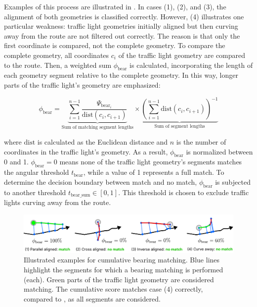 Examples of this process are illustrated in . In cases (1), (2), and (3), the alignment of both geometries is classified correctly. However, (4) illustrates one particular weakness: traffic light geometries initially aligned but then curving away from the route are not filtered out correctly. The reason is that only the first coordinate is compared, not the complete geometry. To compare the complete geometry, all coordinates $c_i$ of the traffic light geometry are compared to the route. Then, a weighted sum $\phi_{\text{bear}}$ is calculated, incorporating the length of each geometry segment relative to the complete geometry. In this way, longer parts of the traffic light's geometry are emphasized:

\begin{equation} 
\phi_{\text{bear}} = 
    \underbrace{\sum_{i=1}^{n-1} 
    \frac{\Psi_{\text{bear}_i}}{\text{dist}(c_i, c_{i+1})}}_{\text{Sum of matching segment lengths}}
    \times
    \underbrace{(\sum_{i=1}^{n-1} \text{dist}(c_i, c_{i+1}))^{-1}}_{\text{Sum of segment lengths}}
\end{equation}

where $\text{dist}$ is calculated as the Euclidean distance and $n$ is the number of coordinates in the traffic light's geometry. As a result, $\phi_{\text{bear}}$ is normalized between 0 and 1. $\phi_{\text{bear}} = 0$ means none of the traffic light geometry's segments matches the angular threshold $t_{\text{bear}}$, while a value of 1 represents a full match. To determine the decision boundary between match and no match, $\phi_{\text{bear}}$ is subjected to another threshold $t_{\text{bear\_sum}} \in [0, 1]$. This threshold is chosen to exclude traffic lights curving away from the route.

\begin{figure}[t]
\centering
\includegraphics[width=\linewidth]{images/sg-selection-bearing-filter-sum.pdf}
\caption{Illustrated examples for cumulative bearing matching. Blue lines highlight the segments for which a bearing matching is performed (each). Green parts of the traffic light geometry are considered matching. The cumulative score matches case (4) correctly, compared to , as all segments are considered.}
\label{fig:sg-selection-bearing-filter-sum}
\end{figure}

